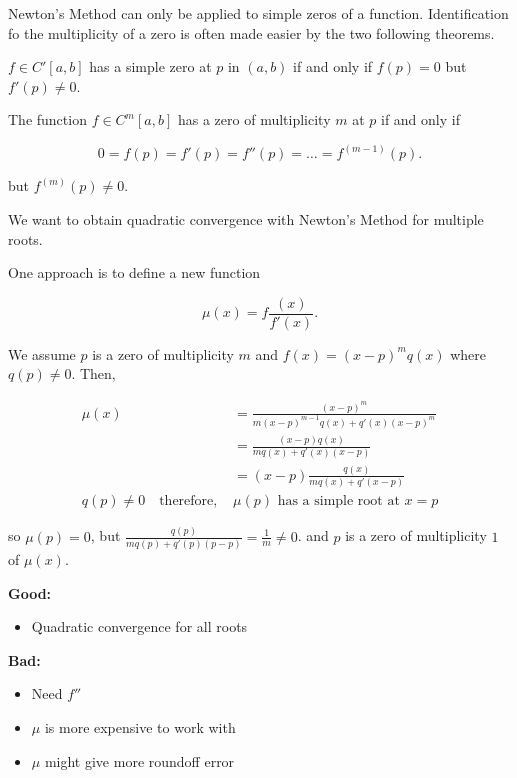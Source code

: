 
Newton's Method can only be applied to simple zeros of a function.
Identification fo the multiplicity of a zero is often made easier by the two
following theorems.


$f\in C'[a,b]$ has a simple zero at $p$ in $(a,b)$ if and only if $f(p) = 0$
but $f'(p) \neq 0$.


The function $f\in C^m[a,b]$ has a zero of multiplicity $m$ at $p$ if and only
if 

\[
  0 = f(p) = f'(p) = f''(p) = \dots = f^{(m-1)}(p)
.\]

but $f^{(m)}(p) \neq 0$.

We want to obtain quadratic convergence with Newton's Method for multiple roots.

One approach is to define a new function

\[
  \mu(x) = f\frac{(x)}{f'(x)}
.\]

We assume $p$ is a zero of multiplicity $m$ and $f(x) = (x-p)^m q(x)$ where
$q(p) \neq 0$. Then,

\begin{align*}
  \mu(x) &= \frac{(x-p)^m}{m(x-p)^{m-1} q(x) + q'(x)(x-p)^m} \\
  &= \frac{(x-p)q(x)}{mq(x) + q'(x) (x-p)}  \\
  &= (x-p) \frac{q(x)}{mq(x)+q'(x-p)} \\
  q(p) \neq 0 \quad\text{therefore, } &\mu(p) \text{ has a simple root at } x=p
\end{align*}

so $\mu(p) = 0$, but $\displaystyle \frac{q(p)}{mq(p) + q'(p)(p-p)} = \frac{1}{m} \neq 0$.
and $p$ is a zero of multiplicity $1$ of $\mu(x)$.

\textbf{Good:}
\begin{itemize}
  \item Quadratic convergence for all roots
\end{itemize}

\textbf{Bad:}
\begin{itemize}
  \item Need $f''$
  \item $\mu$ is more expensive to work with
  \item $\mu$ might give more roundoff error
\end{itemize}

